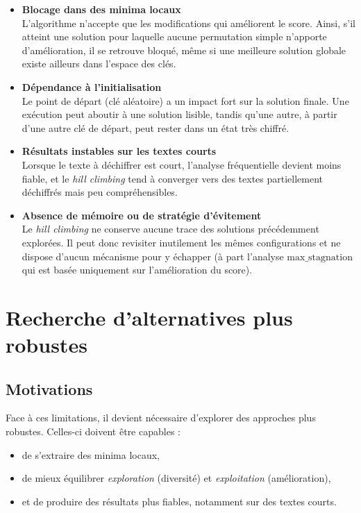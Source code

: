 \documentclass[a4paper]{article}
\begin{document}
\begin{itemize}
    \item \textbf{Blocage dans des minima locaux} \\
    L’algorithme n’accepte que les modifications qui améliorent le score. Ainsi, s’il atteint une solution pour laquelle aucune permutation simple n’apporte d’amélioration, il se retrouve bloqué, même si une meilleure solution globale existe ailleurs dans l’espace des clés.

    \item \textbf{Dépendance à l'initialisation} \\
    Le point de départ (clé aléatoire) a un impact fort sur la solution finale. Une exécution peut aboutir à une solution lisible, tandis qu’une autre, à partir d’une autre clé de départ, peut rester dans un état très chiffré.

    \item \textbf{Résultats instables sur les textes courts} \\
    Lorsque le texte à déchiffrer est court, l’analyse fréquentielle devient moins fiable, et le \textit{hill climbing} tend à converger vers des textes partiellement déchiffrés mais peu compréhensibles.

    \item \textbf{Absence de mémoire ou de stratégie d’évitement} \\
    Le \textit{hill climbing} ne conserve aucune trace des solutions précédemment explorées. Il peut donc revisiter inutilement les mêmes configurations et ne dispose d’aucun mécanisme pour y échapper (à part l'analyse \(\text{max\_stagnation}\) qui est basée uniquement sur l'amélioration du score).
\end{itemize}


\section{Recherche d’alternatives plus robustes}

\subsection{Motivations}

Face à ces limitations, il devient nécessaire d’explorer des approches plus robustes. Celles-ci doivent être capables :
\begin{itemize}
    \item de s’extraire des minima locaux,
    \item de mieux équilibrer \textit{exploration} (diversité) et \textit{exploitation} (amélioration),
    \item et de produire des résultats plus fiables, notamment sur des textes courts.
\end{itemize}
\end{document}
